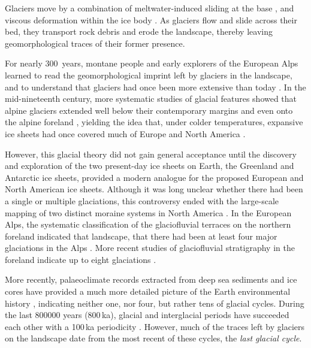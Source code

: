 \documentclass[tc, manuscript]{copernicus}
\begin{document}
    Glaciers move by a combination of meltwater-induced sliding at the base
    \citep[\S532]{Saussure.1779}, and viscous deformation within the ice body
    \citep{Forbes.1846b}. As glaciers flow and slide across their bed, they
    transport rock debris and erode the landscape, thereby leaving
    geomorphological traces of their former presence.

    For nearly 300~years, montane people and early explorers of the European
    Alps learned to read the geomorphological imprint left by glaciers in the
    landscape, and to understand that glaciers had once been more extensive
    than today \citep[e.g.,][p.~21]{Windham.Martel.1744}. In the mid-nineteenth
    century, more systematic studies of glacial features showed that alpine
    glaciers extended well below their contemporary margins \citep{Venetz.1821}
    and even onto the alpine foreland \citep{Charpentier.1841}, yielding the
    idea that, under colder temperatures, expansive ice sheets had once covered
    much of Europe and North America \citep{Agassiz.1840}.

    However, this glacial theory did not gain general acceptance until the
    discovery and exploration of the two present-day ice sheets on Earth, the
    Greenland and Antarctic ice sheets, provided a modern analogue for the
    proposed European and North American ice sheets. Although it was long
    unclear whether there had been a single or multiple glaciations, this
    controversy ended with the large-scale mapping of two distinct moraine
    systems in North America \citep{Chamberlin.1894}. In the European Alps, the
    systematic classification of the glaciofluvial terraces on the northern
    foreland indicated that landscape, that there had been at least four major
    glaciations in the Alps \citep{Penck.Bruckner.1909}. More recent studies
    of glaciofluvial stratigraphy in the foreland indicate up to eight
    glaciations \citep{Ivy-Ochs.etal.2008, Preusser.etal.2011}.

    More recently, palaeoclimate records extracted from deep sea sediments and
    ice cores have provided a much more detailed picture of the Earth
    environmental history \citep[e.g.,][]{Emiliani.1955,
    Shackleton.Opdyke.1973, Dansgaard.etal.1993, Augustin.etal.2004},
    indicating neither one, nor four, but rather tens of glacial cycles. During
    the last 800000 years (800\,ka), glacial and interglacial periods have
    succeeded each other with a 100\,ka periodicity \citep{Hays.etal.1976,
    Augustin.etal.2004}. However, much of the traces left by glaciers on the
    landscape date from the most recent of these cycles, the \emph{last glacial
    cycle}.
\end{document}
